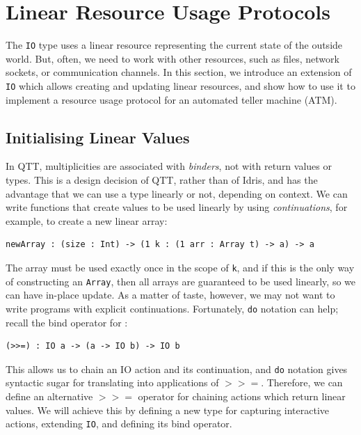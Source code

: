 \section{Linear Resource Usage Protocols}

\label{sec:protocols}

The \texttt{IO} type uses a
linear resource representing the current state of the outside world. But,
often, we need to work with other resources, such as files, network sockets,
or communication channels. In this section, we introduce an extension of
\texttt{IO} which allows creating and updating linear resources, and show how
to use it to implement a resource usage protocol for an automated teller
machine (ATM).

\subsection{Initialising Linear Values}

In QTT, multiplicities are associated with \emph{binders}, not with return
values or types. This is a design decision of QTT, rather than of Idris, and has
the advantage that we can use a type linearly or not, depending on
context. We can write functions that create values to be used linearly by
using \emph{continuations}, for example, to create a new linear array:

\begin{lstlisting}
newArray : (size : Int) -> (1 k : (1 arr : Array t) -> a) -> a
\end{lstlisting}

The array must be used exactly once in the scope of \texttt{k}, and if this is
the only way of constructing an \texttt{Array}, then all arrays are guaranteed
to be used linearly, so we can have in-place update. As a matter of taste, however, we may not want to write
programs with explicit continuations. Fortunately, \texttt{do} notation can
help; recall the bind operator for :

\begin{lstlisting}
(>>=) : IO a -> (a -> IO b) -> IO b
\end{lstlisting}

This allows us to chain an IO action and its continuation, and \texttt{do}
notation gives syntactic sugar for translating into applications of
$\mathtt{>>=}$. Therefore, we can define an alternative $\mathtt{>>=}$
operator for chaining actions which return linear values. We will achieve
this by defining a new type for capturing interactive actions, extending
\texttt{IO}, and defining its bind operator.

